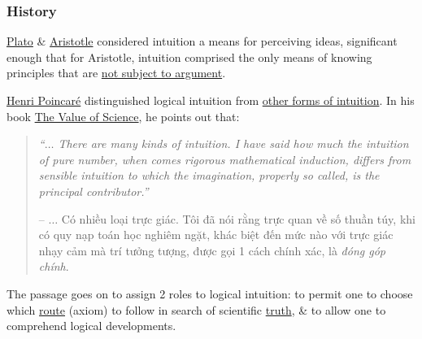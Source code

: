 \documentclass{article}
\begin{document}
\subsubsection{History}
\href{https://en.wikipedia.org/wiki/Plato}{Plato} \& \href{https://en.wikipedia.org/wiki/Aristotle}{Aristotle} considered intuition a means for perceiving ideas, significant enough that for Aristotle, intuition comprised the only means of knowing principles that are \href{https://en.wikipedia.org/wiki/A_priori_and_a_posteriori}{not subject to argument}.

\href{https://en.wikipedia.org/wiki/Henri_Poincar%C3%A9}{\sc Henri Poincar\'e} distinguished logical intuition from \href{https://en.wikipedia.org/wiki/Intuition}{other forms of intuition}. In his book \href{https://en.wikipedia.org/wiki/The_Value_of_Science}{The Value of Science}, he points out that:
\begin{quote}
	{\it``$\ldots$ There are many kinds of intuition. I have said how much the intuition of pure number, when comes rigorous mathematical induction, differs from sensible intuition to which the imagination, properly so called, is the {\it principal contributor}.''}
	
	-- $\ldots$ Có nhiều loại trực giác. Tôi đã nói rằng trực quan về số thuần túy, khi có quy nạp toán học nghiêm ngặt, khác biệt đến mức nào với trực giác nhạy cảm mà trí tưởng tượng, được gọi 1 cách chính xác, là {\it đóng góp chính}.	
\end{quote}
The passage goes on to assign 2 roles to logical intuition: to permit one to choose which \href{https://en.wikipedia.org/wiki/Axiom}{route} (axiom) to follow in search of scientific \href{https://en.wikipedia.org/wiki/Truth}{truth}, \& to allow one to comprehend logical developments.
\end{document}
